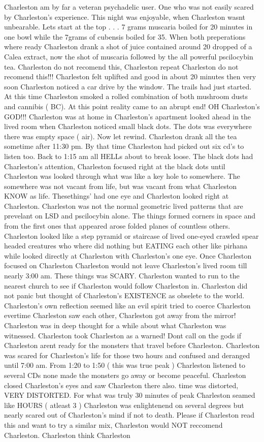 \documentclass[12pt]{book}
\begin{document}
Charleston am by far a veteran psychadelic user. One who was not easily scared by Charleston's experience. This night was enjoyable, when Charleston wasnt unbearable. Lets start at the top . . .  7 grams muscaria boiled for 20 minutes in one bowl while the 7grams of cubensis boiled for 35. When both preperations where ready Charleston drank a shot of juice contained around 20 dropped of a Calea extract, now the shot of muscaria followed by the all powerful pscilocybin tea. Charleston do not recomend this, Charleston repeat Charleston do not recomend this!!! Charleston felt uplifted and good in about 20 minutes then very soon Charleston noticed a car drive by the window. The trails had just started. At this time Charleston smoked a rolled combination of both mushroom dusts and cannibis ( BC). At this point reality came to an abrupt end! OH Charleston's GOD!!! Charleston was at home in Charleston's apartment looked ahead in the lived room when Charleston noticed small black dots. The dots was everywhere there was empty space ( air). Now let rewind. Charleston drank all the tea sometime after 11:30 pm. By that time Charleston had picked out six cd's to listen too. Back to 1:15 am all HELLs about to break loose. The black dots had Charleston's attention, Charleston focused right at the black dots until Charleston was looked through what was like a key hole to somewhere. The somewhere was not vacant from life, but was vacant from what Charleston KNOW as life. Thesethings' had one eye and Charleston looked right at Charleston. Charleston was not the normal geometric lived patterns that are prevelant on LSD and pscilocybin alone. The things formed corners in space and from the first ones that appeared arose folded planes of countless others. Charleston looked like a step pyramid or staircase of lived one-eyed crawled spear headed creatures who where did nothing but EATING each other like pirhana while looked directly at Charleston with Charleston's one eye. Once Charleston focused on Charleston Charleston would not leave Charleston's lived room till nearly 3:00 am. These things was SCARY. Charleston wanted to run to the nearest church to see if Charleston would follow Charleston in. Charleston did not panic but thought of Charleston's EXISTENCE as obselete to the world. Charleston's own reflection seemed like an evil spirit tried to coerce Charleston evertime Charleston saw each other, Charleston got away from the mirror! Charleston was in deep thought for a while about what Charleston was witnessed. Charleston took Charleston as a warned! Dont call on the gods if Charleston arent ready for the monsters that travel before Charleston. Charleston was scared for Charleston's life for those two hours and confused and deranged until 7:00 am. From 1:20 to 1:50 ( this was true peak ) Charleston listened to several CDs none made the monsters go away or become peaceful. Charleston closed Charleston's eyes and saw Charleston there also. time was distorted, VERY DISTORTED. For what was truly 30 minutes of peak Charleston seamed like HOURS ( atleast 3 ) Charleston was enlightenend on several degrees but nearly scared out of Charleston's mind if not to death. Please if Charleston read this and want to try a similar mix, Charleston would NOT reccomend Charleston. Charleston think Charleston 
\end{document}
